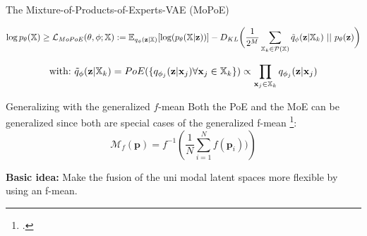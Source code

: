     \begin{frame}{The Mixture-of-Products-of-Experts-VAE (MoPoE)}
        \begin{figure}
            \centering
        \end{figure}

        \begin{small}
            \begin{equation*}
                \log p_{\theta}(\mathbb{X}) \geq \mathcal{L}_{MoPoE}(\theta, \phi; \mathbb{X}):= \mathbb{E}_{q_{\phi}(\textbf{z}|\mathbb{X})}[\log (p_{\theta}(\mathbb{X}|\textbf{z}))] - D_{KL}\biggl( \frac{1}{2^M} \sum _{\mathbb{X}_k \in \mathcal{P}(\mathbb{X})} \tilde{q}_{\phi}(\textbf{z}|\mathbb{X}_k)\ ||\ p_{\theta}(\textbf{z})\biggr)
            \end{equation*}

            \begin{equation*}
                \text{with:}\ \tilde{q}_{\phi}(\textbf{z}|\xsubset)=PoE(\{q_{\phi_j}(\textbf{z}|\textbf{x}_j) \forall \textbf{x}_j \in \xsubset\}) \propto \prod _{\textbf{x}_j \in \xsubset}q_{\phi_j}(\textbf{z}|\textbf{x}_j)
            \end{equation*}

        \end{small}

    \end{frame}

    \begin{frame}{Generalizing with the generalized $f$-mean}
        Both the PoE and the MoE can be generalized since both are special cases of the generalized f-mean \footcite{niculescu_convex_2018}:
        $$\mathcal{M}_{f}\left( \textbf{p} \right) = f^{-1}\left( \frac{1}{N} \sum ^N _{i=1} f(\textbf{p}_i)) \right)$$

        \textbf{Basic idea:}
        Make the fusion of the uni modal latent spaces more flexible by using an f-mean.
    \end{frame}

